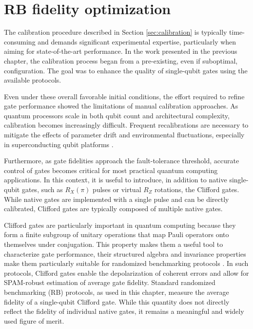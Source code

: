 \chapter{RB fidelity optimization}
The calibration procedure described in Section \ref{sec:calibration} is typically time-consuming and demands significant experimental expertise, particularly when aiming for state-of-the-art performance. 
In the work presented in the previous chapter, the calibration process began from a pre-existing, even if suboptimal, configuration. 
The goal was to enhance the quality of single-qubit gates using the available \Qibocal protocols.

Even under these overall favorable initial conditions, the effort required to refine gate performance showed the limitations of manual calibration approaches. 
As quantum processors scale in both qubit count and architectural complexity, calibration becomes increasingly difficult. 
Frequent recalibrations are necessary to mitigate the effects of parameter drift and environmental fluctuations, especially in superconducting qubit platforms \cite{krantz_quantum_2019}.

Furthermore, as gate fidelities approach the fault-tolerance threshold, accurate control of gates becomes critical for most practical quantum computing applications.
In this context, it is useful to introduce, in addition to native single-qubit gates, such as $R_X(\pi)$ pulses or virtual $R_Z$ rotations, the Clifford gates. 
While native gates are implemented with a single pulse and can be directly calibrated, Clifford gates are typically composed of multiple native gates.

Clifford gates are particularly important in quantum computing because they form a finite subgroup of unitary operations that map Pauli operators onto themselves under conjugation. 
This property makes them a useful tool to characterize gate performance, their structured algebra and invariance properties make them particularly suitable for randomized benchmarking protocols \cite{knill_randomized_2008}.  
In such protocols, Clifford gates enable the depolarization of coherent errors and allow for SPAM-robust estimation of average gate fidelity. 
Standard randomized benchmarking (RB) protocols, as used in this chapter, measure the average fidelity of a single-qubit Clifford gate. 
While this quantity does not directly reflect the fidelity of individual native gates, it remains a meaningful and widely used figure of merit.

